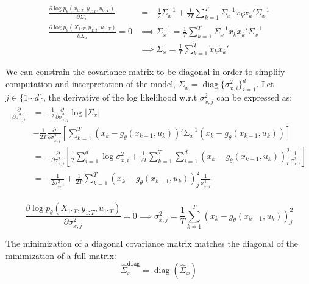 \documentclass[10pt,a4paper]{report}
\DeclareMathOperator{\diag}{diag}
\begin{document}
\begin{align*}
	\frac{\partial \log p_\theta(x_{0:T}, y_{0:T}, u_{0:T})}{\partial \Sigma_x}     & = -\frac{1}{2} \Sigma_x^{-1} + \frac{1}{2T} \sum_{k=1}^T \Sigma_x^{-1}\tilde x_k \tilde x_k'\Sigma_x^{-1} \\
	\frac{\partial \log p_\theta(X_{1:T}, y_{1:T}, u_{1:T})}{\partial \Sigma_x} = 0 & \implies \Sigma_x^{-1} = \frac{1}{T}\sum_{k=1}^T \Sigma_x^{-1}\tilde x_k \tilde x_k'\Sigma_x^{-1}         \\
											& \implies \Sigma_x = \frac{1}{T}\sum_{k=1}^T\tilde x_k \tilde x_k'
\end{align*}

We can constrain the covariance matrix to be diagonal in order to simplify computation and interpretation of the model, $\Sigma_x = \diag{\{\sigma_{x, i}^2\}_{i=1}^d}$.
Let $j \in \{1 \cdots d\}$, the derivative of the log likelihood w.r.t $\sigma_{x, j}^2$ can be expressed as:
\begin{align*}
	\frac{\partial}{\partial \sigma_{x, j}^2} & = -\frac{1}{2} \frac{\partial}{\partial \sigma_{x, j}^2} \log|\Sigma_x|                                                                                                                                             \\
						  & - \frac{1}{2T} \frac{\partial}{\partial \sigma_{x, j}^2} \left[ \sum_{k=1}^{T}(x_k - g_\theta(x_{k-1}, u_{k}))' \Sigma_x^{-1} (x_k - g_\theta(x_{k-1}, u_{k})) \right]                                              \\
						  & = - \frac{\partial}{\partial \sigma_{x, j}^2} \left[ \frac{1}{2} \sum_{i=1}^d \log \sigma_{x, i}^2  + \frac{1}{2T} \sum_{k=1}^T \sum_{i=1}^d (x_k - g_\theta(x_{k-1}, u_{k}))_i^2 \frac{1}{\sigma_{x, i}^2} \right] \\
						  & = -\frac{1}{2 \sigma_{x, j}^2} + \frac{1}{2T} \sum_{k=1}^T (x_k - g_\theta(x_{k-1}, u_{k}))_j^2 \frac{1}{\sigma_{x, j}^4}                                                                                           \\
\end{align*}

$$
	\frac{\partial \log p_\theta(X_{1:T}, y_{1:T}, u_{1:T})}{\partial \sigma_{x, j}^2} = 0 \implies \sigma_{x, j}^2 = \frac{1}{T}\sum_{k=1}^T (x_k - g_\theta(x_{k-1}, u_k))_j^2
$$

The minimization of a diagonal covariance matrix matches the diagonal of the minimization of a full matrix:
$$
	\widehat \Sigma_x^{\texttt{diag}} = \diag \left( \widehat \Sigma_x \right)
$$
\end{document}
